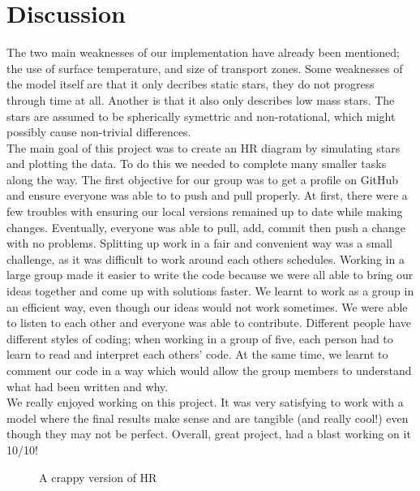 \documentclass[10pt]{article}
\begin{document}
\section{Discussion}
The two main weaknesses of our implementation have already been mentioned; the use of surface temperature, and size of transport zones. Some weaknesses of the model itself are that it only decribes static stars, they do not progress through time at all. Another is that it also only describes low mass stars. The stars are assumed to be spherically symettric and non-rotational, which might possibly cause non-trivial differences.  \\
The main goal of this project was to create an HR diagram by simulating stars and plotting the data. To do this we needed to complete many smaller tasks along the way. The first objective for our group was to get a profile on GitHub and ensure everyone was able to to push and pull properly. At first, there were a few troubles with  ensuring our local versions remained up to date while making changes. Eventually, everyone was able to pull, add, commit then push a change with no problems. Splitting up work in a fair and convenient way was a small challenge, as it was difficult to work around each others schedules. Working in a large group made it easier to write the code because we were all able to bring our ideas together and come up with solutions faster. We learnt to work as a group in an efficient way, even though our ideas would not work sometimes. We were able to listen to each other and everyone was able to contribute. Different people have different styles of coding; when working in a group of five, each person had to learn to read and interpret each others' code. At the same time, we learnt to comment our code in a way which would allow the group members to understand what had been written and why. \\

We really enjoyed working on this project. It was very satisfying to work with a model where the final results make sense and are tangible (and really cool!) even though they may not be perfect. Overall, great project, had a blast working on it 10/10!\\


\begin{figure}[p]
\begin{centering}

\caption{A crappy version of HR}
\label{fig:badHR}
\end{centering}
\end{figure}
\end{document}
